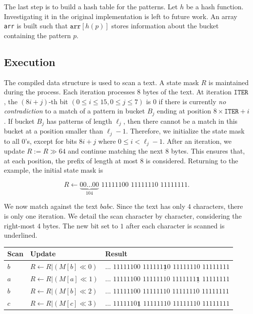 The last step is to build a hash table for the patterns. Let $h$ be a hash function. Investigating it in the original implementation is left to future work. An array \texttt{arr} is built such that $\texttt{arr}[h(p)]$ stores information about the bucket containing the pattern $p$.


\subsection{Execution}

The compiled data structure is used to scan a text. A state mask $R$ is maintained during the process. Each iteration processes $8$ bytes of the text. At iteration $\texttt{ITER}$, the $(8i+j)$-th bit $(0\le i\le 15, 0 \le j \le 7)$ is $0$ if there is currently \textit{no contradiction} to a match of a pattern in bucket $B_j$ ending at position $8\times\texttt{ITER}+i$. If bucket $B_j$ has patterns of length $\ell_j$, then there cannot be a match in this bucket at a position smaller than $\ell_j-1$. Therefore, we initialize the state mask to all $0$'s, except for bits $8i+j$ where $0\le i< \ell_j-1$. After an iteration, we update $R:= R \gg 64$ and continue matching the next $8$ bytes. This ensures that, at each position, the prefix of length at most $8$ is considered. Returning to the example, the initial state mask is

$$R \leftarrow \underbrace{00\ldots00}_{104} \,\, 11111100\,\,11111110\,\,11111111.$$

We now match against the text $babc$. Since the text has only $4$ characters, there is only one iteration. We detail the scan character by character, considering the right-most $4$ bytes. The new bit set to $1$ after each character is scanned is underlined.

\begin{tabular*}{\textwidth}{lll}
  Scan & Update & Result\\
  \hline
  $b$ & $ R\gets R | (M[b] \ll 0)$ & $\ldots\,\,11111100\,\,111111\underline{\bm{1}}0\,\,11111110\,\,11111111$\\
  $a$ & $ R\gets R | (M[a] \ll 1)$ & $\ldots\,\,11111100\,\,11111110\,\,1111111\underline{\bm{1}}\,\,11111111$\\
  $b$ & $ R\gets R | (M[b] \ll 2)$ & $\ldots\,\,11111100\,\,11111110\,\,11111110\,\,11111111$\\
  $c$ & $ R\gets R | (M[c] \ll 3)$ & $\ldots\,\,1111110\underline{\bm{1}}\,\,11111110\,\,11111110\,\,11111111$
\end{tabular*}

